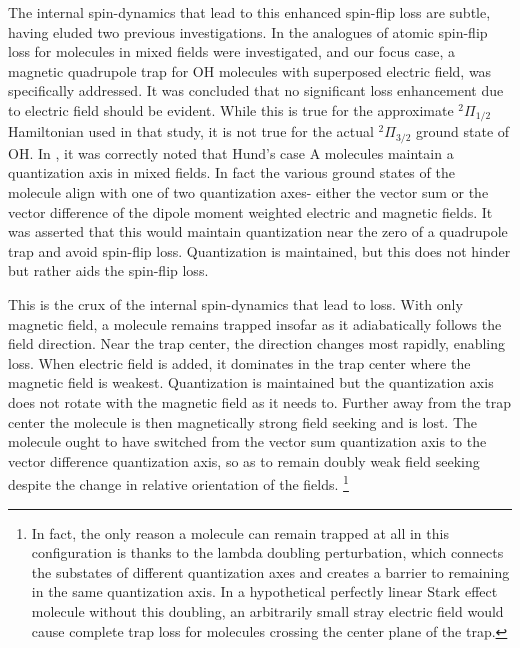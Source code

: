 \documentclass[%
 reprint,
 amsmath,amssymb,
 aps,
prl,
]{revtex4-1}
\begin{document}
The internal spin-dynamics that lead to this enhanced spin-flip loss are subtle, having eluded two previous investigations. In \cite{Lara2008} the analogues of atomic spin-flip loss for molecules in mixed fields were investigated, and our focus case, a magnetic quadrupole trap for OH molecules with superposed electric field, was specifically addressed. It was concluded that no significant loss enhancement due to electric field should be evident. While this is true for the approximate $^2\Pi_{1/2}$ Hamiltonian used in that study, it is not true for the actual $^2\Pi_{3/2}$ ground state of OH. In \cite{Bohn2013}, it was correctly noted that Hund's case A molecules maintain a quantization axis in mixed fields. In fact the various ground states of the molecule align with one of two quantization axes- either the vector sum or the vector difference of the dipole moment weighted electric and magnetic fields. It was asserted that this would maintain quantization near the zero of a quadrupole trap and avoid spin-flip loss. Quantization is maintained, but this does not hinder but rather aids the spin-flip loss. 

This is the crux of the internal spin-dynamics that lead to loss. With only magnetic field, a molecule remains trapped insofar as it adiabatically follows the field direction. Near the trap center, the direction changes most rapidly, enabling loss. When electric field is added, it dominates in the trap center where the magnetic field is weakest. Quantization is maintained but the quantization axis does not rotate with the magnetic field as it needs to. Further away from the trap center the molecule is then magnetically strong field seeking and is lost. The molecule ought to have switched from the vector sum quantization axis to the vector difference quantization axis, so as to remain doubly weak field seeking despite the change in relative orientation of the fields. \footnote{In fact, the only reason a molecule can remain trapped at all in this configuration is thanks to the lambda doubling perturbation, which connects the substates of different quantization axes and creates a barrier to remaining in the same quantization axis. In a hypothetical perfectly linear Stark effect molecule without this doubling, an arbitrarily small stray electric field would cause complete trap loss for molecules crossing the center plane of the trap.}%
\end{document}

